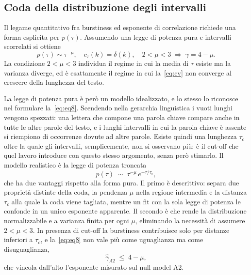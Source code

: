 \subsection{Coda della distribuzione degli intervalli}
\label{sec:coda}

Il legame quantitativo fra burstiness ed esponente di correlazione richiede una
forma esplicita per $p(\tau)$. Assumendo una legge di potenza pura e intervalli
scorrelati si ottiene
\begin{equation}
  p(\tau) \sim \tau^{-\mu}, \quad c_\tau(k) = \delta(k), \quad 2 < \mu < 3
  \;\Longrightarrow\;
  \gamma = 4 - \mu .
  \label{eq:eq8}
\end{equation}
La condizione $2<\mu<3$ individua il regime in cui la media di $\tau$ esiste ma
la varianza diverge, ed è esattamente il regime in cui la~\eqref{eq:cv} non
converge al crescere della lunghezza del testo.

La legge di potenza pura è però un modello idealizzato, e lo stesso
\cite{altmann2012} lo riconosce nel formulare la~\eqref{eq:eq8}. Scendendo
nella gerarchia linguistica i vuoti lunghi vengono spezzati: una lettera che
compone una parola chiave compare anche in tutte le altre parole del testo, e i
lunghi intervalli in cui la parola chiave è assente si riempiono di occorrenze
dovute ad altre parole. Esiste quindi una lunghezza $\tau_c$ oltre la quale gli
intervalli, semplicemente, non si osservano più: è il cut-off che quel lavoro
introduce con questo stesso argomento, senza però stimarlo. Il modello
realistico è la legge di potenza troncata
\begin{equation}
  p(\tau) \;\sim\; \tau^{-\mu}\,e^{-\tau/\tau_c},
  \label{eq:troncata}
\end{equation}
che ha due vantaggi rispetto alla forma pura. Il primo è descrittivo: separa due
proprietà distinte della coda, la pendenza $\mu$ nella regione intermedia e la
distanza $\tau_c$ alla quale la coda viene tagliata, mentre un fit con la sola
legge di potenza le confonde in un unico esponente apparente. Il secondo è che
rende la distribuzione normalizzabile e a varianza finita per ogni $\mu$,
eliminando la necessità di assumere $2<\mu<3$. In presenza di cut-off la
burstiness contribuisce solo per distanze inferiori a $\tau_c$, e
la~\eqref{eq:eq8} non vale più come uguaglianza ma come disuguaglianza,
\[
  \hat\gamma_{A2} \;\le\; 4 - \mu ,
\]
che vincola dall'alto l'esponente misurato sul null model A2.

